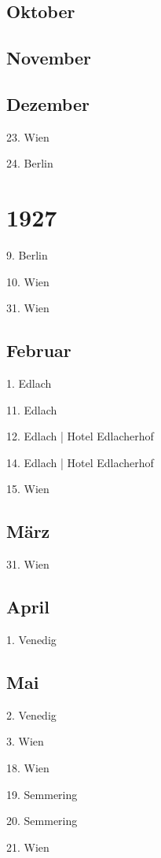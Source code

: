 \documentclass[twoside=false,titlepage=false,open=any, parskip=never, fontsize=10pt, headings=small, chapterprefix=false, appendixprefix=false, DIV=15]{scrbook}
\begin{document}
\begin{multicols}{3}
            \section*{Oktober}
            \section*{November}
            \section*{Dezember}
            23. Wien\par
            24. Berlin\par
            \chapter*{1927}
            9. Berlin\par
            10. Wien\par
            31. Wien\par
            \section*{Februar}
            1. Edlach\par
            11. Edlach\par
            12. Edlach | Hotel Edlacherhof\par
            14. Edlach | Hotel Edlacherhof\par
            15. Wien\par
            \section*{März}
            31. Wien\par
            \section*{April}
            1. Venedig\par
            \section*{Mai}
            2. Venedig\par
            3. Wien\par
            18. Wien\par
            19. Semmering\par
            20. Semmering\par
            21. Wien\par

\end{multicols}
\end{document}
